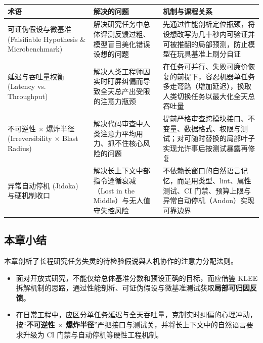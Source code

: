 \documentclass[UTF8,a4paper,11pt,fontset=fandol]{ctexart}
\begin{document}
\begin{center}\small\begin{tabularx}{\linewidth}{YYY}

\toprule

术语 & 解决的问题 & 机制与课程关系\\\midrule

可证伪假设与微基准 (Falsifiable Hypothesis \& Microbenchmark) & 解决研究任务中总体评测反馈过粗、模型盲目美化错误设想的问题 & 先通过性能剖析定位瓶颈，将设想改写为几十秒内可验证并可被推翻的局部预测，防止模型在玩具基准上刷分自证\\[3pt]

延迟与吞吐量权衡 (Latency vs. Throughput) & 解决人类工程师因实时盯屏纠偏而导致全天总产出受限的注意力瓶颈 & 在任务可并行、失败可廉价恢复的前提下，容忍机器单任务多走弯路（增加延迟），换取人类切换任务以最大化全天总吞吐量\\[3pt]

不可逆性 \ensuremath{\times} 爆炸半径 (Irreversibility \ensuremath{\times} Blast Radius) & 解决代码审查中人类注意力平均用力、抓不住核心风险的问题 & 提前严格审查跨模块接口、不变量、数据格式、权限与测试；对可随时替换的局部叶子实现允许事后按测试暴露再修复\\[3pt]

异常自动停机 (Jidoka) 与硬机制收口 & 解决长上下文中部指令遵循衰减（Lost in the Middle）与无人值守失控风险 & 不依赖长窗口的自然语言记忆，而是用类型、lint、属性测试、CI 门禁、预算上限与异常自动停机（Andon）实现可靠边界\\[3pt]

\bottomrule\end{tabularx}\end{center}

\subsection{本章小结}

本章剖析了长程研究任务失灵的待检验假说與人机协作的注意力分配法则。

\begin{itemize}
\item 面对开放式研究，不能仅给总体基准分数和预设正确的目标，而应借鉴 KLEE 拆解机制的思路，通过性能剖析、可证伪假设与微基准测试获取\textbf{局部可归因反馈}。

\item 在日常工程中，应区分单任务延迟与全天吞吐量，克制实时纠偏的心理冲动，按“\textbf{不可逆性 \ensuremath{\times} 爆炸半径}”严把接口与测试关，并将长上下文中的自然语言要求升级为 CI 门禁与自动停机等硬性工程机制。
\end{itemize}
\end{document}
